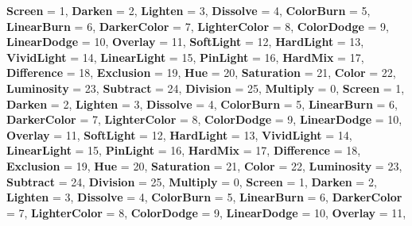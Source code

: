 \begin{DoxyCompactItemize}
{\bfseries Screen} = 1, 
\newline
{\bfseries Darken} = 2, 
{\bfseries Lighten} = 3, 
{\bfseries Dissolve} = 4, 
{\bfseries Color\+Burn} = 5, 
\newline
{\bfseries Linear\+Burn} = 6, 
{\bfseries Darker\+Color} = 7, 
{\bfseries Lighter\+Color} = 8, 
{\bfseries Color\+Dodge} = 9, 
\newline
{\bfseries Linear\+Dodge} = 10, 
{\bfseries Overlay} = 11, 
{\bfseries Soft\+Light} = 12, 
{\bfseries Hard\+Light} = 13, 
\newline
{\bfseries Vivid\+Light} = 14, 
{\bfseries Linear\+Light} = 15, 
{\bfseries Pin\+Light} = 16, 
{\bfseries Hard\+Mix} = 17, 
\newline
{\bfseries Difference} = 18, 
{\bfseries Exclusion} = 19, 
{\bfseries Hue} = 20, 
{\bfseries Saturation} = 21, 
\newline
{\bfseries Color} = 22, 
{\bfseries Luminosity} = 23, 
{\bfseries Subtract} = 24, 
{\bfseries Division} = 25, 
\newline
{\bfseries Multiply} = 0, 
{\bfseries Screen} = 1, 
{\bfseries Darken} = 2, 
{\bfseries Lighten} = 3, 
\newline
{\bfseries Dissolve} = 4, 
{\bfseries Color\+Burn} = 5, 
{\bfseries Linear\+Burn} = 6, 
{\bfseries Darker\+Color} = 7, 
\newline
{\bfseries Lighter\+Color} = 8, 
{\bfseries Color\+Dodge} = 9, 
{\bfseries Linear\+Dodge} = 10, 
{\bfseries Overlay} = 11, 
\newline
{\bfseries Soft\+Light} = 12, 
{\bfseries Hard\+Light} = 13, 
{\bfseries Vivid\+Light} = 14, 
{\bfseries Linear\+Light} = 15, 
\newline
{\bfseries Pin\+Light} = 16, 
{\bfseries Hard\+Mix} = 17, 
{\bfseries Difference} = 18, 
{\bfseries Exclusion} = 19, 
\newline
{\bfseries Hue} = 20, 
{\bfseries Saturation} = 21, 
{\bfseries Color} = 22, 
{\bfseries Luminosity} = 23, 
\newline
{\bfseries Subtract} = 24, 
{\bfseries Division} = 25, 
{\bfseries Multiply} = 0, 
{\bfseries Screen} = 1, 
\newline
{\bfseries Darken} = 2, 
{\bfseries Lighten} = 3, 
{\bfseries Dissolve} = 4, 
{\bfseries Color\+Burn} = 5, 
\newline
{\bfseries Linear\+Burn} = 6, 
{\bfseries Darker\+Color} = 7, 
{\bfseries Lighter\+Color} = 8, 
{\bfseries Color\+Dodge} = 9, 
\newline
{\bfseries Linear\+Dodge} = 10, 
{\bfseries Overlay} = 11, 

\end{DoxyCompactItemize}
